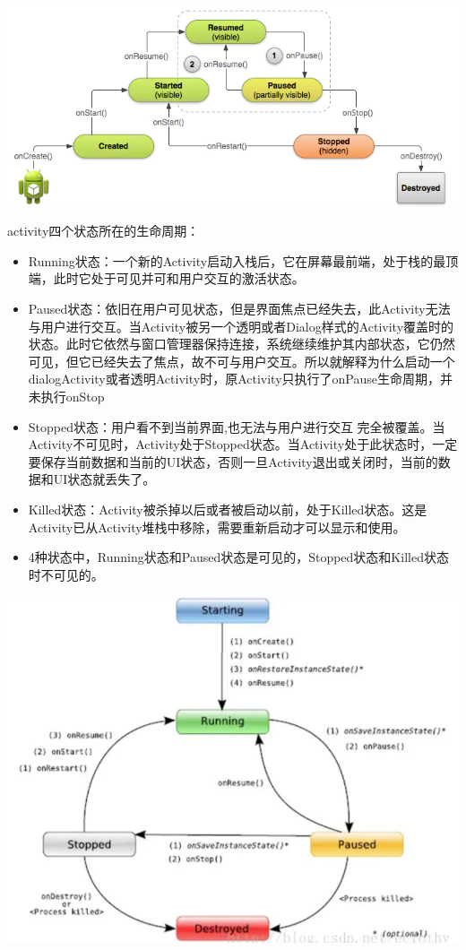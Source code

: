 \documentclass[9pt, b5paaper]{book}
\begin{document}
\includegraphics[width=.9\linewidth]{./pic/states.png}

activity四个状态所在的生命周期：

\begin{itemize}
\item Running状态：一个新的Activity启动入栈后，它在屏幕最前端，处于栈的最顶端，此时它处于可见并可和用户交互的激活状态。
\item Paused状态：依旧在用户可见状态，但是界面焦点已经失去，此Activity无法与用户进行交互。当Activity被另一个透明或者Dialog样式的Activity覆盖时的状态。此时它依然与窗口管理器保持连接，系统继续维护其内部状态，它仍然可见，但它已经失去了焦点，故不可与用户交互。所以就解释为什么启动一个dialogActivity或者透明Activity时，原Activity只执行了onPause生命周期，并未执行onStop
\item Stopped状态：用户看不到当前界面,也无法与用户进行交互 完全被覆盖。当Activity不可见时，Activity处于Stopped状态。当Activity处于此状态时，一定要保存当前数据和当前的UI状态，否则一旦Activity退出或关闭时，当前的数据和UI状态就丢失了。
\item Killed状态：Activity被杀掉以后或者被启动以前，处于Killed状态。这是Activity已从Activity堆栈中移除，需要重新启动才可以显示和使用。
\item 4种状态中，Running状态和Paused状态是可见的，Stopped状态和Killed状态时不可见的。
\end{itemize}

\includegraphics[width=.9\linewidth]{./pic/func.png}
\end{document}
